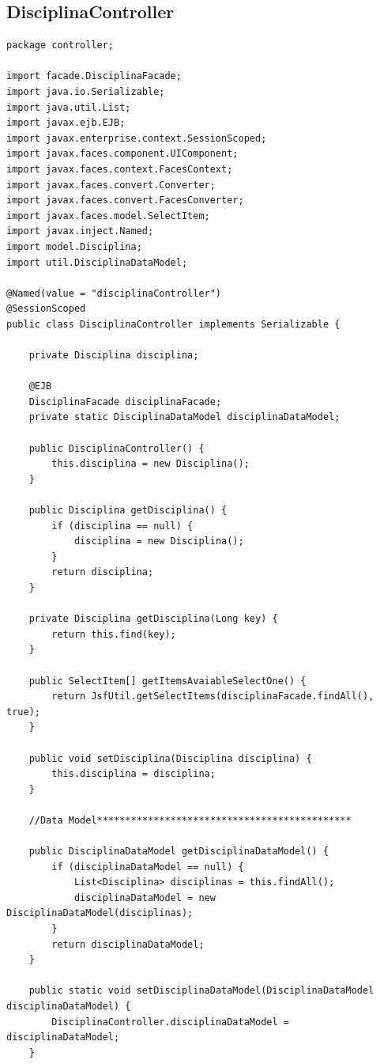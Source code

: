 \documentclass[12pt,a4paper]{article}
\begin{document}
\subsection{DisciplinaController}
\label{subsectionDisciplinaController}
\begin{lstlisting}
package controller;

import facade.DisciplinaFacade;
import java.io.Serializable;
import java.util.List;
import javax.ejb.EJB;
import javax.enterprise.context.SessionScoped;
import javax.faces.component.UIComponent;
import javax.faces.context.FacesContext;
import javax.faces.convert.Converter;
import javax.faces.convert.FacesConverter;
import javax.faces.model.SelectItem;
import javax.inject.Named;
import model.Disciplina;
import util.DisciplinaDataModel;

@Named(value = "disciplinaController")
@SessionScoped
public class DisciplinaController implements Serializable {

    private Disciplina disciplina;

    @EJB
    DisciplinaFacade disciplinaFacade;
    private static DisciplinaDataModel disciplinaDataModel;

    public DisciplinaController() {
        this.disciplina = new Disciplina();
    }

    public Disciplina getDisciplina() {
        if (disciplina == null) {
            disciplina = new Disciplina();
        }
        return disciplina;
    }

    private Disciplina getDisciplina(Long key) {
        return this.find(key);
    }

    public SelectItem[] getItemsAvaiableSelectOne() {
        return JsfUtil.getSelectItems(disciplinaFacade.findAll(), true);
    }

    public void setDisciplina(Disciplina disciplina) {
        this.disciplina = disciplina;
    }

    //Data Model*********************************************
    
    public DisciplinaDataModel getDisciplinaDataModel() {
        if (disciplinaDataModel == null) {
            List<Disciplina> disciplinas = this.findAll();
            disciplinaDataModel = new DisciplinaDataModel(disciplinas);
        }
        return disciplinaDataModel;
    }

    public static void setDisciplinaDataModel(DisciplinaDataModel disciplinaDataModel) {
        DisciplinaController.disciplinaDataModel = disciplinaDataModel;
    }


\end{lstlisting}
\end{document}
